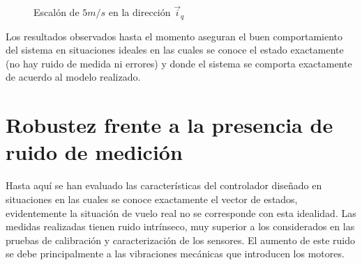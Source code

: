 \documentclass[main]{subfiles}
\begin{document}
\begin{figure}
  \centering
 
  \caption{Escal\'on de $5m/s$ en la direcci\'on $\vec{i}_q$}
  \label{fig:rec_esc_x}
\end{figure}

Los resultados observados hasta el momento aseguran el buen comportamiento del sistema en situaciones ideales en las cuales se conoce el estado exactamente (no hay ruido de medida ni errores) y donde el sistema se comporta exactamente de acuerdo al modelo realizado.\\

\section{Robustez frente a la presencia de ruido de medici\'on}

Hasta aqu\'i se han evaluado las caracter\'isticas del controlador diseñado en situaciones en las cuales se conoce exactamente el vector de estados, evidentemente la situaci\'on de vuelo real no se corresponde con esta idealidad. Las medidas realizadas tienen ruido intr\'inseco, muy superior a los considerados en las pruebas de calibraci\'on y caracterizaci\'on de los sensores. El aumento de este ruido se debe principalmente a las vibraciones mec\'anicas que introducen los motores.\\
\end{document}
